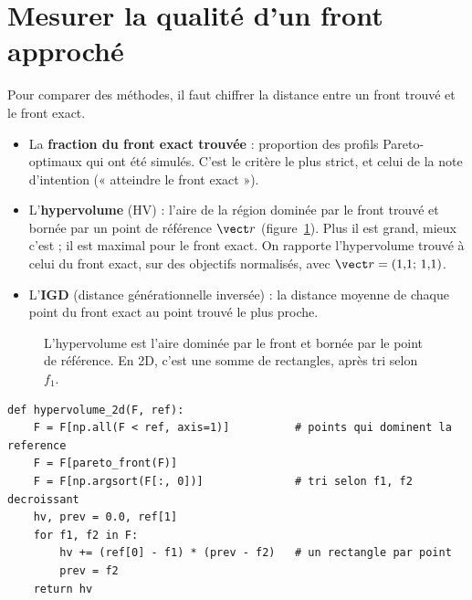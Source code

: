 \section{Mesurer la qualité d'un front approché}
Pour comparer des méthodes, il faut chiffrer la distance entre un front trouvé et le front exact.
\begin{itemize}
\item La \textbf{fraction du front exact trouvée} : proportion des profils Pareto-optimaux qui ont été simulés. C'est le critère le plus strict, et celui de la note d'intention (« atteindre le front exact »).
\item L'\textbf{hypervolume} (HV) : l'aire de la région dominée par le front trouvé et bornée par un point de référence $\vect r$ (figure~\ref{fig:hv}). Plus il est grand, mieux c'est ; il est maximal pour le front exact. On rapporte l'hypervolume trouvé à celui du front exact, sur des objectifs normalisés, avec $\vect r=(1{,}1;\,1{,}1)$.
\item L'\textbf{IGD} (distance générationnelle inversée) : la distance moyenne de chaque point du front exact au point trouvé le plus proche.
\end{itemize}

\begin{figure}[htbp]
\centering
{}
\caption{L'hypervolume est l'aire dominée par le front et bornée par le point de référence. En 2D, c'est une somme de rectangles, après tri selon $f_1$.}\label{fig:hv}
\end{figure}

\begin{codebox}
\begin{lstlisting}
def hypervolume_2d(F, ref):
    F = F[np.all(F < ref, axis=1)]          # points qui dominent la reference
    F = F[pareto_front(F)]
    F = F[np.argsort(F[:, 0])]              # tri selon f1, f2 decroissant
    hv, prev = 0.0, ref[1]
    for f1, f2 in F:
        hv += (ref[0] - f1) * (prev - f2)   # un rectangle par point
        prev = f2
    return hv
\end{lstlisting}
\end{codebox}


